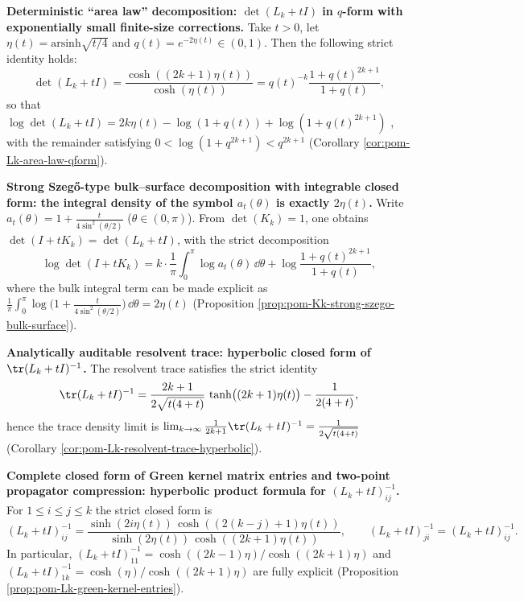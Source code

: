     \item \textbf{Deterministic ``area law'' decomposition: \texorpdfstring{\(\det(L_k+tI)\)}{det(L_k+tI)} in \(q\)-form with exponentially small finite-size corrections.}
    Take \(t>0\), let
    \(
    \eta(t)=\mathrm{arsinh}\sqrt{t/4}
    \)
    and \(q(t)=e^{-2\eta(t)}\in(0,1)\).
    Then the following strict identity holds:
    \[
    \det(L_k+tI)=\frac{\cosh((2k+1)\eta(t))}{\cosh(\eta(t))}
    =q(t)^{-k}\frac{1+q(t)^{2k+1}}{1+q(t)},
    \]
    so that
    \(
    \log\det(L_k+tI)=2k\eta(t)-\log(1+q(t))+\log(1+q(t)^{2k+1})
    \)
    , with the remainder satisfying \(0<\log(1+q^{2k+1})<q^{2k+1}\) (Corollary \ref{cor:pom-Lk-area-law-qform}).

    \item \textbf{Strong Szeg\H{o}-type bulk--surface decomposition with integrable closed form: the integral density of the symbol \texorpdfstring{\(a_t(\theta)\)}{a_t(theta)} is exactly \texorpdfstring{\(2\eta(t)\)}{2 eta(t)}.}
    Write
    \(a_t(\theta)=1+\frac{t}{4\sin^2(\theta/2)}\) (\(\theta\in(0,\pi)\)).
    From \(\det(K_k)=1\), one obtains \(\det(I+tK_k)=\det(L_k+tI)\), with the strict decomposition
    \[
    \log\det(I+tK_k)
    =k\cdot \frac{1}{\pi}\int_{0}^{\pi}\log a_t(\theta)\,\dd\theta
    +\log\frac{1+q(t)^{2k+1}}{1+q(t)},
    \]
    where the bulk integral term can be made explicit as
    \(
    \frac{1}{\pi}\int_{0}^{\pi}\log\!\bigl(1+\frac{t}{4\sin^2(\theta/2)}\bigr)\,\dd\theta
    =2\eta(t)
    \)
    (Proposition \ref{prop:pom-Kk-strong-szego-bulk-surface}).

    \item \textbf{Analytically auditable resolvent trace: hyperbolic closed form of \texorpdfstring{\(\tr(L_k+tI)^{-1}\)}{tr((L_k+tI)^{-1})}.}
    The resolvent trace satisfies the strict identity
    \[
    \tr(L_k+tI)^{-1}
    =\frac{2k+1}{2\sqrt{t(4+t)}}\,\tanh\bigl((2k+1)\eta(t)\bigr)-\frac{1}{2(4+t)},
    \]
    hence the trace density limit is
    \(
    \lim_{k\to\infty}\frac{1}{2k+1}\tr(L_k+tI)^{-1}=\frac{1}{2\sqrt{t(4+t)}}
    \)
    (Corollary \ref{cor:pom-Lk-resolvent-trace-hyperbolic}).

    \item \textbf{Complete closed form of Green kernel matrix entries and two-point propagator compression: hyperbolic product formula for \texorpdfstring{\((L_k+tI)^{-1}_{ij}\)}{(L_k+tI)^{-1}_{ij}}.}
    For \(1\le i\le j\le k\) the strict closed form is
    \[
    (L_k+tI)^{-1}_{ij}
    =\frac{\sinh(2i\eta(t))\,\cosh((2(k-j)+1)\eta(t))}
    {\sinh(2\eta(t))\,\cosh((2k+1)\eta(t))},
    \qquad (L_k+tI)^{-1}_{ji}=(L_k+tI)^{-1}_{ij}.
    \]
    In particular,
    \(
    (L_k+tI)^{-1}_{11}=\cosh((2k-1)\eta)/\cosh((2k+1)\eta)
    \)
    and
    \(
    (L_k+tI)^{-1}_{1k}=\cosh(\eta)/\cosh((2k+1)\eta)
    \)
    are fully explicit (Proposition \ref{prop:pom-Lk-green-kernel-entries}).

